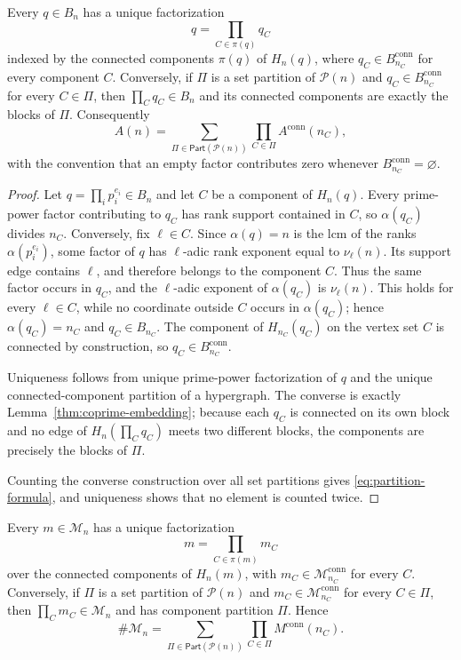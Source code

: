 \begin{theorem}\label{thm:birth-connected-factorization}
Every $q\in B_n$ has a unique factorization
\[
q=\prod_{C\in\pi(q)}q_C
\]
indexed by the connected components $\pi(q)$ of $H_n(q)$, where
$q_C\in B_{n_C}^{\mathrm{conn}}$ for every component $C$. Conversely, if
$\Pi$ is a set partition of $\mathcal P(n)$ and
$q_C\in B_{n_C}^{\mathrm{conn}}$ for every $C\in\Pi$, then
$\prod_C q_C\in B_n$ and its connected components are exactly the blocks of
$\Pi$. Consequently
\begin{equation}\label{eq:partition-formula}
A(n)=\sum_{\Pi\in\mathsf{Part}(\mathcal P(n))}
\prod_{C\in\Pi}A^{\mathrm{conn}}(n_C),
\end{equation}
with the convention that an empty factor contributes zero whenever
$B_{n_C}^{\mathrm{conn}}=\varnothing$.
\end{theorem}

\begin{proof}
Let $q=\prod_i p_i^{e_i}\in B_n$ and let $C$ be a component of $H_n(q)$.
Every prime-power factor contributing to $q_C$ has rank support contained in
$C$, so $\alpha(q_C)$ divides $n_C$. Conversely, fix $\ell\in C$. Since
$\alpha(q)=n$ is the lcm of the ranks $\alpha(p_i^{e_i})$, some factor of
$q$ has $\ell$-adic rank exponent equal to $\nu_\ell(n)$. Its support edge
contains $\ell$, and therefore belongs to the component $C$. Thus the same
factor occurs in $q_C$, and the $\ell$-adic exponent of $\alpha(q_C)$ is
$\nu_\ell(n)$. This holds for every $\ell\in C$, while no coordinate outside
$C$ occurs in $\alpha(q_C)$; hence $\alpha(q_C)=n_C$ and
$q_C\in B_{n_C}$. The component of $H_{n_C}(q_C)$ on the vertex set $C$ is
connected by construction, so $q_C\in B_{n_C}^{\mathrm{conn}}$.

Uniqueness follows from unique prime-power factorization of $q$ and the
unique connected-component partition of a hypergraph. The converse is exactly
Lemma~\ref{thm:coprime-embedding}; because each $q_C$ is connected on its
own block and no edge of $H_n(\prod_C q_C)$ meets two different blocks, the
components are precisely the blocks of $\Pi$.

Counting the converse construction over all set partitions gives
\eqref{eq:partition-formula}, and uniqueness shows that no element is counted
twice.
\end{proof}

\begin{theorem}\label{thm:mingenerator-connected-factorization}
Every $m\in\mathcal M_n$ has a unique factorization
\[
m=\prod_{C\in\pi(m)}m_C
\]
over the connected components of $H_n(m)$, with
$m_C\in\mathcal M_{n_C}^{\mathrm{conn}}$ for every $C$. Conversely, if
$\Pi$ is a set partition of $\mathcal P(n)$ and
$m_C\in\mathcal M_{n_C}^{\mathrm{conn}}$ for every $C\in\Pi$, then
$\prod_C m_C\in\mathcal M_n$ and has component partition $\Pi$. Hence
\begin{equation}\label{eq:minimal-partition-formula}
\#\mathcal M_n=
\sum_{\Pi\in\mathsf{Part}(\mathcal P(n))}
\prod_{C\in\Pi}M^{\mathrm{conn}}(n_C).
\end{equation}
\end{theorem}

